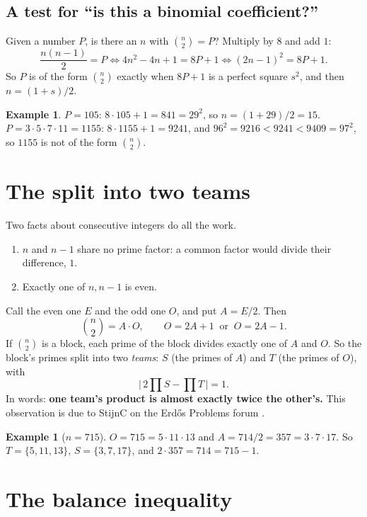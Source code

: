 \documentclass[11pt]{article}
\theoremstyle{definition}
\newtheorem{example}[theorem]{Example}
\theoremstyle{remark}
\begin{document}
\subsection{A test for ``is this a binomial coefficient?''}
Given a number $P$, is there an $n$ with $\binom{n}{2} = P$? Multiply by $8$ and add $1$:
\[
\frac{n(n-1)}{2} = P \iff 4n^2 - 4n + 1 = 8P + 1 \iff (2n-1)^2 = 8P+1 .
\]
So $P$ is of the form $\binom{n}{2}$ exactly when $8P+1$ is a perfect square $s^2$, and
then $n = (1+s)/2$.

\begin{example}
$P = 105$: $8\cdot105+1 = 841 = 29^2$, so $n = (1+29)/2 = 15$.
$P = 3\cdot5\cdot7\cdot11 = 1155$: $8\cdot 1155 + 1 = 9241$, and $96^2 = 9216 < 9241 < 9409 = 97^2$,
so $1155$ is not of the form $\binom{n}{2}$.
\end{example}

\section{The split into two teams}

Two facts about consecutive integers do all the work.
\begin{enumerate}[label=(\roman*)]
\item $n$ and $n-1$ share no prime factor: a common factor would divide their difference, $1$.
\item Exactly one of $n, n-1$ is even.
\end{enumerate}
Call the even one $E$ and the odd one $O$, and put $A = E/2$. Then
\[
\binom{n}{2} = A\cdot O, \qquad O = 2A+1 \ \text{ or } \ O = 2A-1 .
\]
If $\binom{n}{2}$ is a block, each prime of the block divides exactly one of $A$ and $O$. So
the block's primes split into two \emph{teams}: $S$ (the primes of $A$) and $T$ (the
primes of $O$), with
\[
\Big|\, 2\prod S - \prod T \,\Big| = 1 .
\]
In words: \textbf{one team's product is almost exactly twice the other's.} This observation
is due to StijnC on the Erd\H{o}s Problems forum \cite{EPF}.

\begin{example}[$n=715$]
$O = 715 = 5\cdot 11\cdot 13$ and $A = 714/2 = 357 = 3\cdot 7\cdot 17$. So
$T = \{5,11,13\}$, $S = \{3,7,17\}$, and $2\cdot 357 = 714 = 715 - 1$.
\end{example}

\section{The balance inequality}
\end{document}
